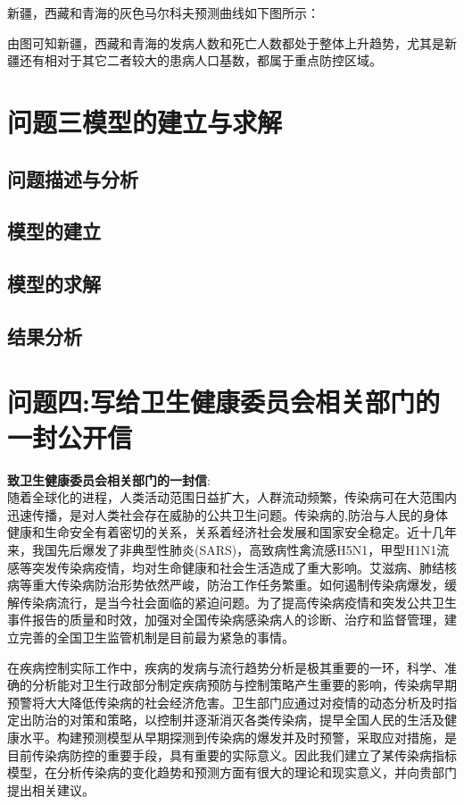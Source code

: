 \documentclass{whutmod}
\begin{document}
 
    新疆，西藏和青海的灰色马尔科夫预测曲线如下图所示：
    
    由图可知新疆，西藏和青海的发病人数和死亡人数都处于整体上升趋势，尤其是新疆还有相对于其它二者较大的患病人口基数，都属于重点防控区域。

     	\section{问题三模型的建立与求解}
     \subsection{问题描述与分析}
    
     
     
     \subsection{模型的建立}
     
     
     
     
     \subsection{模型的求解}   
     
     
     \subsection{结果分析}
     
     
    \section{问题四:写给卫生健康委员会相关部门的一封公开信}
    \textbf{致卫生健康委员会相关部门的一封信}:
    ~\\
    
    随着全球化的进程，人类活动范围日益扩大，人群流动频繁，传染病可在大范围内迅速传播，是对人类社会存在威胁的公共卫生问题。传染病的,防治与人民的身体健康和生命安全有着密切的关系，关系着经济社会发展和国家安全稳定。近十几年来，我国先后爆发了非典型性肺炎(SARS)，高致病性禽流感H5N1，甲型H1N1流感等突发传染病疫情，均对生命健康和社会生活造成了重大影响。艾滋病、肺结核病等重大传染病防治形势依然严峻，防治工作任务繁重。如何遏制传染病爆发，缓解传染病流行，是当今社会面临的紧迫问题。为了提高传染病疫情和突发公共卫生事件报告的质量和时效，加强对全国传染病感染病人的诊断、治疗和监督管理，建立完善的全国卫生监管机制是目前最为紧急的事情。
    
    在疾病控制实际工作中，疾病的发病与流行趋势分析是极其重要的一环，科学、准确的分析能对卫生行政部分制定疾病预防与控制策略产生重要的影响，传染病早期预警将大大降低传染病的社会经济危害。卫生部门应通过对疫情的动态分析及时指定出防治的对策和策略，以控制并逐渐消灭各类传染病，提早全国人民的生活及健康水平。构建预测模型从早期探测到传染病的爆发并及时预警，采取应对措施，是目前传染病防控的重要手段，具有重要的实际意义。因此我们建立了某传染病指标模型，在分析传染病的变化趋势和预测方面有很大的理论和现实意义，并向贵部门提出相关建议。
    
\end{document}

